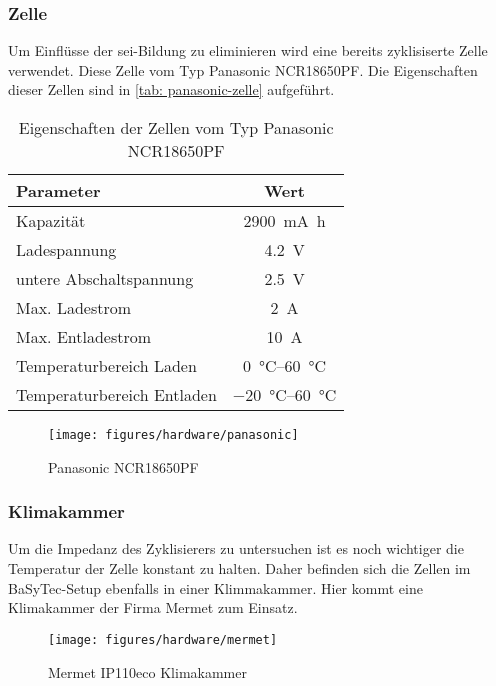 \subsubsection{Zelle}
Um Einflüsse der \gls{sei}-Bildung zu eliminieren wird eine bereits zyklisiserte Zelle verwendet.
Diese Zelle vom Typ Panasonic NCR18650PF\@.
Die Eigenschaften dieser Zellen sind in \autoref{tab: panasonic-zelle} aufgeführt.
\begin{table}[H]
    \centering
    \begin{tabular}{lc}
        \toprule
        Parameter & Wert \\
        \midrule
        Kapazität & \SI{2900}{\milli\ampere\hour} \\
        Ladespannung & \SI{4.2}{\volt} \\
        untere Abschaltspannung & \SI{2.5}{\volt} \\
        Max. Ladestrom & \SI{2}{\ampere} \\
        Max. Entladestrom & \SI{10}{\ampere} \\
        Temperaturbereich Laden & \SIrange{0}{60}{\celsius} \\
        Temperaturbereich Entladen & \SIrange{-20}{60}{\celsius} \\
        \bottomrule
    \end{tabular}
    \caption{Eigenschaften der Zellen vom Typ Panasonic NCR18650PF}
    \label{tab: panasonic-zelle}
\end{table}

\begin{figure} [H]
    \centering
    \texttt{[image: figures/hardware/panasonic]}
    \caption{Panasonic NCR18650PF~\cite{panasonic}}
    \label{fig:panasonic-pic}
\end{figure}



\subsubsection{Klimakammer}
Um die Impedanz des Zyklisierers zu untersuchen ist es noch wichtiger die Temperatur der Zelle konstant zu halten.
Daher befinden sich die Zellen im BaSyTec-Setup ebenfalls in einer Klimmakammer.
Hier kommt eine Klimakammer der Firma Mermet zum Einsatz.

\begin{figure} [H]
    \centering
    \texttt{[image: figures/hardware/mermet]}
    \caption{Mermet IP110eco Klimakammer~\cite{mermet_chamber}}
    \label{fig:mermet}
\end{figure}

